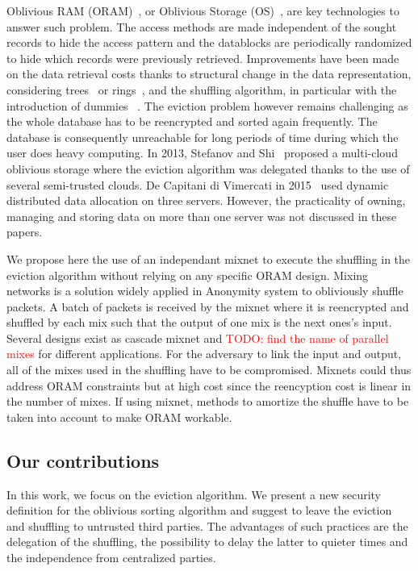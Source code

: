 \documentclass[english,oneside,twocolumn]{article}
\newcommand{\todo}[1]{\textcolor{red}{TODO: #1}}
\begin{document}
Oblivious RAM (ORAM)~\cite{goldreich87}, or Oblivious Storage (OS)~\cite{boneh2011}, are key technologies to answer such problem. The access methods are made independent of the sought records to hide the access pattern and the datablocks are periodically randomized to hide which records were previously retrieved.
Improvements have been made on the data retrieval costs thanks to structural change in the data representation, considering trees~\cite{stefanov2013path} or rings~\cite{ren2014ring}, and the shuffling algorithm, in particular with the introduction of dummies ~\cite{ohrimenko2014melbourne}.
The eviction problem however remains challenging as the whole database has to be reencrypted and sorted again frequently. The database is consequently unreachable for long periods of time during which the user does heavy computing.
In 2013, Stefanov and Shi~\cite{stefanov2013} proposed a multi-cloud oblivious storage where the eviction algorithm was delegated thanks to the use of several semi-trusted clouds. De Capitani di Vimercati in 2015~\cite{dithree} used dynamic distributed data allocation on three servers.
However, the practicality of owning, managing and storing data on more than one server was not discussed in these papers.

We propose here the use of an independant mixnet to execute the shuffling in the eviction algorithm without relying on any specific ORAM design.
Mixing networks is a solution widely applied in Anonymity system to obliviously shuffle packets. A batch of packets is received by the mixnet where it is reencrypted and shuffled by each mix such that the output of one mix is the next ones's input.
Several designs exist as cascade mixnet and  \todo{find the name of parallel mixes} for different applications.
For the adversary to link the input and output, all of the mixes used in the shuffling have to be compromised.
Mixnets could thus address ORAM constraints but at high cost since the reencyption cost is linear in the number of mixes. If using mixnet, methods to amortize the shuffle have to be taken into account to make ORAM workable.

\subsection{Our contributions}
In this work, we focus on the eviction algorithm. We present a new security definition for the oblivious sorting algorithm and suggest to leave the eviction and shuffling to untrusted third parties.
The advantages of such practices are the delegation of the shuffling, the possibility to delay the latter to quieter times and the independence from centralized parties.
\end{document}
